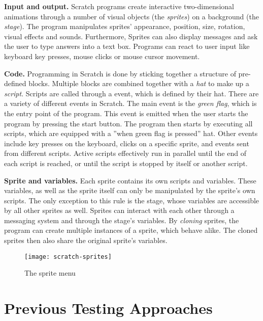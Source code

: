 \textbf{Input and output.}
Scratch programs create interactive two-dimensional animations through a number of visual objects (the \textit{sprites}) on a background (the \textit{stage}).
The program manipulates sprites' appearance, position, size, rotation, visual effects and sounds.
Furthermore, Sprites can also display messages and ask the user to type answers into a text box.
Programs can react to user input like keyboard key presses, mouse clicks or mouse cursor movement.

\textbf{Code.}
Programming in Scratch is done by sticking together a structure of pre-defined blocks.
Multiple blocks are combined together with a \textit{hat} to make up a \textit{script}.
Scripts are called through a event, which is defined by their hat. %
There are a variety of different events in Scratch.
The main event is the \textit{green flag}, which is the entry point of the program.
This event is emitted when the user starts the program by pressing the start button.
The program then starts by executing all scripts, which are equipped with a ''when green flag is pressed'' hat.
Other events include key presses on the keyboard, clicks on a specific sprite, and events sent from different scripts.
Active scripts effectively run in parallel until the end of each script is reached, or until the script is stopped by itself or another script.

\textbf{Sprite and variables.}
Each sprite contains its own scripts and variables.
These variables, as well as the sprite itself can only be manipulated by the sprite's own scripts.
The only exception to this rule is the stage, whose variables are accessible by all other sprites as well.
Sprites can interact with each other through a messaging system and through the stage's variables.
By \textit{cloning} sprites, the program can create multiple instances of a sprite, which behave alike.
The cloned sprites then also share the original sprite's variables.

\begin{wrapfigure}{r}{0.45\textwidth + 5mm}
    \centering
    \vspace{-4mm}
    \texttt{[image: scratch-sprites]}
    \caption{The sprite menu}
    \label{fig:the_sprite_menu}
\end{wrapfigure}

\section{Previous Testing Approaches}%
\label{sec:previous_testing_approaches}

